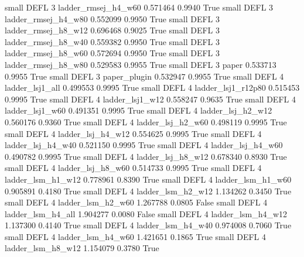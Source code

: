      small     DEFL                 3      ladder_rmsej_h4_w60   0.571464      0.9940    True
     small     DEFL                 3      ladder_rmsej_h4_w80   0.552099      0.9950    True
     small     DEFL                 3      ladder_rmsej_h8_w12   0.696468      0.9025    True
     small     DEFL                 3      ladder_rmsej_h8_w40   0.559382      0.9950    True
     small     DEFL                 3      ladder_rmsej_h8_w60   0.572694      0.9950    True
     small     DEFL                 3      ladder_rmsej_h8_w80   0.529583      0.9955    True
     small     DEFL                 3                    paper   0.533713      0.9955    True
     small     DEFL                 3             paper_plugin   0.532947      0.9955    True
     small     DEFL                 4          ladder_lsj1_all   0.499553      0.9995    True
     small     DEFL                 4       ladder_lsj1_r12p80   0.515453      0.9995    True
     small     DEFL                 4          ladder_lsj1_w12   0.558247      0.9635    True
     small     DEFL                 4          ladder_lsj1_w60   0.491351      0.9995    True
     small     DEFL                 4        ladder_lsj_h2_w12   0.560176      0.9360    True
     small     DEFL                 4        ladder_lsj_h2_w60   0.498119      0.9995    True
     small     DEFL                 4        ladder_lsj_h4_w12   0.554625      0.9995    True
     small     DEFL                 4        ladder_lsj_h4_w40   0.521150      0.9995    True
     small     DEFL                 4        ladder_lsj_h4_w60   0.490782      0.9995    True
     small     DEFL                 4        ladder_lsj_h8_w12   0.678340      0.8930    True
     small     DEFL                 4        ladder_lsj_h8_w60   0.514733      0.9995    True
     small     DEFL                 4        ladder_lsm_h1_w12   0.778961      0.8390    True
     small     DEFL                 4        ladder_lsm_h1_w60   0.905891      0.4180    True
     small     DEFL                 4        ladder_lsm_h2_w12   1.134262      0.3450    True
     small     DEFL                 4        ladder_lsm_h2_w60   1.267788      0.0805   False
     small     DEFL                 4        ladder_lsm_h4_all   1.904277      0.0080   False
     small     DEFL                 4        ladder_lsm_h4_w12   1.137300      0.4140    True
     small     DEFL                 4        ladder_lsm_h4_w40   0.974008      0.7060    True
     small     DEFL                 4        ladder_lsm_h4_w60   1.421651      0.1865    True
     small     DEFL                 4        ladder_lsm_h8_w12   1.154079      0.3780    True
